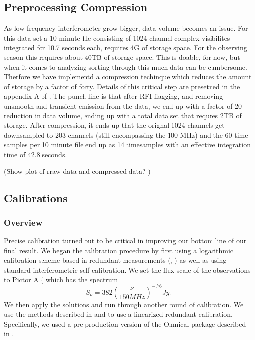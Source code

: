 \documentclass[twocolumn,numberedappendix]{emulateapj}
\begin{document}
\subsection{Preprocessing Compression}
As low frequency interferometer grow bigger, data volume becomes an issue. For
this data set a 10 minute file consisting of 1024 channel complex visibilites
integrated for 10.7 seconds each, requires 4G of storage space. For the
observing season this requires about 40TB of storage space. This is doable, for
now, but when it comes to analyzing sorting through this much data can be
cumbersome. Therfore we have implementd a compression techinque which reduces
the amount of storage by a factor of forty. 
Details of this critical step are presetned in the appendix A of
\citep{parsons2014a}.  The punch line is that after RFI flagging, and removing
unsmooth and transient emission from the data, we end up with a factor of 20
reduction in data volume, ending up with a total data set that requres 2TB of
storage. After compression, it ends up that the orignal 1024 channels get
downsampled to 203 channels (still encompassing the 100 MHz) and the 60 time
samples per 10 minute file end up as 14 timesamples with an effective
integration time of 42.8 seconds. 

(Show plot of rraw data and compressed data? )
\subsection{Calibrations}
\subsubsection{Overview}
Precise calibration turned out to be critical in improving our bottom line of
our final result. We began the calibration procedure by first using a
logarithmic calibration scheme based in redundant measurements
(\citep{liu_et_al2010}, \citep{zheng_et_al2014}) as well as using standard
interferometric self calibration. We set the flux scale of the observations to
Pictor A (\citep{jacobs_et_al_pictor} which has the spectrum 
\begin{equation}
    S_{\nu} = 382(\frac{\nu}{150 MHz})^{-.76} Jy.
\end{equation}
We then apply the solutions and run through another round of calibration. We use
the methods described in \citep{liu_et_al2010} and \citep{zheng_et_al2014} to
use a linearized redundant calibration. Specifically, we used a pre production
version of the Omnical package described in \citep{zhend_et_al2014}.
\end{document}

